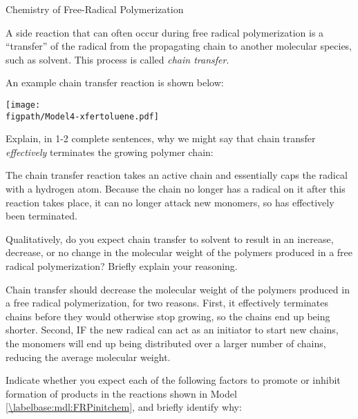 \begin{activity}{Chemistry of Free-Radical Polymerization}
\begin{ctqs}
\end{ctqs}

		

\begin{model}
\label{\labelbase:mdl:FRPxferchem}

	A side reaction that can often occur during free radical polymerization is a ``transfer'' of the radical from the propagating chain to another molecular species, such as solvent.  This process is called \emph{chain transfer}.
	
	An example chain transfer reaction is shown below:
	
			\centerline{\texttt{[image: \\figpath/Model4-xfertoluene.pdf]}}
	
\end{model}

\begin{ctqs}
	\question Explain, in 1-2 complete sentences, why we might say that chain transfer \emph{effectively} terminates the growing polymer chain:
	
		\begin{solution}[1.75in]{}
			The chain transfer reaction takes an active chain and essentially caps the radical with a hydrogen atom.  Because the chain no longer has a radical on it after this reaction takes place, it can no longer attack new monomers, so has effectively been terminated.
		\end{solution}
	
	\question Qualitatively, do you expect chain transfer to solvent to result in an increase, decrease, or no change in the molecular weight of the polymers produced in a free radical polymerization?  Briefly explain your reasoning.
	
		\begin{solution}[1.75in]{}
			Chain transfer should decrease the molecular weight of the polymers produced in a free radical polymerization, for two reasons.  First, it effectively terminates chains before they would otherwise stop growing, so the chains end up being shorter.  Second, IF the new radical can act as an initiator to start new chains, the monomers will end up being distributed over a larger number of chains, reducing the average molecular weight.
		\end{solution}
		
\end{ctqs}


\begin{exercises}

	\exercise Indicate whether you expect each of the following factors to promote or inhibit formation of products in the reactions shown in Model \ref{\labelbase:mdl:FRPinitchem}, and briefly identify why: %
	

\end{exercises}
\end{activity}
